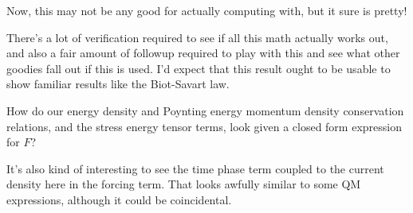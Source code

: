 Now, this may not be any good for actually computing with, but it sure is pretty!

There's a lot of verification required to see if all this math actually works out, and
also a fair amount of followup required to play with this and see what other goodies fall out if this is used.  I'd expect that this result ought to be usable to show familiar
results like the Biot-Savart law.

How do our energy density and Poynting energy momentum density conservation relations, and the stress energy tensor terms, look given a closed form expression for $F$?

It's also kind of interesting to see the time phase term coupled to the current density here in the forcing term.  That looks awfully similar to some QM expressions, although it
could be coincidental.
